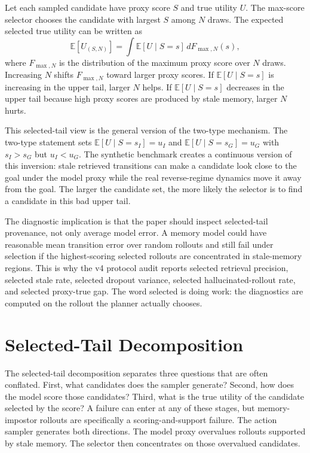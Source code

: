 \documentclass{article}
\begin{document}
Let each sampled candidate have proxy score $S$ and true utility $U$. The
max-score selector chooses the candidate with largest $S$ among $N$ draws. The
expected selected true utility can be written as
\[
\mathbb{E}[U_{(S,N)}]
  = \int \mathbb{E}[U\mid S=s]\, dF_{\max,N}(s),
\]
where $F_{\max,N}$ is the distribution of the maximum proxy score over $N$
draws. Increasing $N$ shifts $F_{\max,N}$ toward larger proxy scores. If
$\mathbb{E}[U\mid S=s]$ is increasing in the upper tail, larger $N$ helps. If
$\mathbb{E}[U\mid S=s]$ decreases in the upper tail because high proxy scores
are produced by stale memory, larger $N$ hurts.

This selected-tail view is the general version of the two-type mechanism. The
two-type statement sets $\mathbb{E}[U\mid S=s_I]=u_I$ and
$\mathbb{E}[U\mid S=s_G]=u_G$ with $s_I>s_G$ but $u_I<u_G$. The synthetic
benchmark creates a continuous version of this inversion: stale retrieved
transitions can make a candidate look close to the goal under the model proxy
while the real reverse-regime dynamics move it away from the goal. The larger
the candidate set, the more likely the selector is to find a candidate in this
bad upper tail.

The diagnostic implication is that the paper should inspect selected-tail
provenance, not only average model error. A memory model could have reasonable
mean transition error over random rollouts and still fail under selection if
the highest-scoring selected rollouts are concentrated in stale-memory
regions. This is why the v4 protocol audit reports selected retrieval precision,
selected stale rate, selected dropout variance, selected hallucinated-rollout
rate, and selected proxy-true gap. The word selected is doing work: the
diagnostics are computed on the rollout the planner actually chooses.

\section{Selected-Tail Decomposition}
\label{app:selected-tail}

The selected-tail decomposition separates three questions that are often
conflated. First, what candidates does the sampler generate? Second, how does
the model score those candidates? Third, what is the true utility of the
candidate selected by the score? A failure can enter at any of these stages,
but memory-impostor rollouts are specifically a scoring-and-support failure.
The action sampler generates both directions. The model proxy overvalues
rollouts supported by stale memory. The selector then concentrates on those
overvalued candidates.
\end{document}

